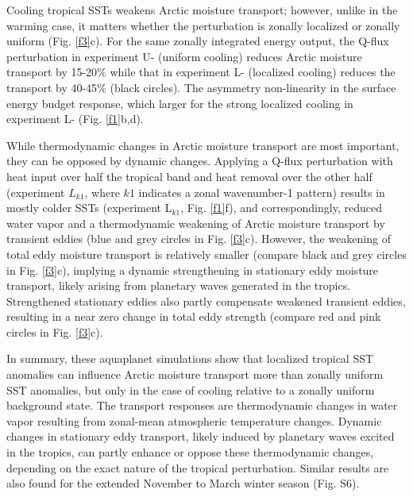 \documentclass[draft]{agujournal2019}
\begin{document}
Cooling tropical SSTs weakens Arctic moisture transport; however, unlike in the warming case, it matters whether the perturbation is zonally localized or zonally uniform (Fig. \ref{f3}c). For the same zonally integrated energy output, the Q-flux perturbation in experiment U- (uniform cooling) reduces Arctic moisture transport by 15-20$\%$ while that in experiment L- (localized cooling) reduces the transport by 40-45$\%$ (black circles). The asymmetry  non-linearity in the surface energy budget response, which  larger for the strong localized cooling in experiment L- (Fig. \ref{f1}b,d). 






While thermodynamic changes in Arctic moisture transport are most important, they can be opposed by dynamic changes. Applying a Q-flux perturbation with heat input over half the tropical band and heat removal over the other half (experiment $L_{k1}$, where $k1$ indicates a zonal wavenumber-1 pattern) results in mostly colder SSTs (experiment L$_{k1}$, Fig. \ref{f1}f), and correspondingly, reduced water vapor and a thermodynamic weakening of Arctic moisture transport by transient eddies (blue and grey circles in Fig. \ref{f3}c). However, the weakening of total eddy moisture transport is relatively smaller (compare black and grey circles in Fig. \ref{f3}c), implying a dynamic strengthening in stationary eddy moisture transport, likely arising from planetary waves generated in the tropics. Strengthened stationary eddies also partly compensate weakened transient eddies, resulting in a near zero change in total eddy strength (compare red and pink circles in Fig. \ref{f3}c).


In summary, these aquaplanet simulations show that localized tropical SST anomalies can influence Arctic moisture transport more than zonally uniform SST anomalies, but only in the case of cooling relative to a zonally uniform background state. The transport responses are  thermodynamic changes in water vapor resulting from zonal-mean atmospheric temperature changes. Dynamic changes in stationary eddy transport, likely induced by planetary waves excited in the tropics, can partly enhance or oppose these thermodynamic changes, depending on the exact nature of the tropical perturbation. Similar results are also found for the extended November to March winter season (Fig. S6).
\end{document}
